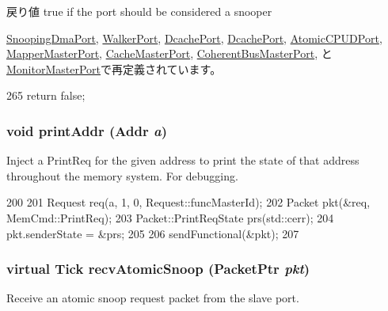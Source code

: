 \begin{DoxyReturn}{戻り値}
true if the port should be considered a snooper 
\end{DoxyReturn}


\hyperlink{classArmISA_1_1TableWalker_1_1SnoopingDmaPort_a32602a6a3c3d66a639455036d6c08dd6}{SnoopingDmaPort}, \hyperlink{classX86ISA_1_1Walker_1_1WalkerPort_a5ce11b7a254d3cb756d94568f7cbc25d}{WalkerPort}, \hyperlink{classFullO3CPU_1_1DcachePort_a32602a6a3c3d66a639455036d6c08dd6}{DcachePort}, \hyperlink{classOzoneLWLSQ_1_1DcachePort_a32602a6a3c3d66a639455036d6c08dd6}{DcachePort}, \hyperlink{classAtomicSimpleCPU_1_1AtomicCPUDPort_a5ce11b7a254d3cb756d94568f7cbc25d}{AtomicCPUDPort}, \hyperlink{classAddrMapper_1_1MapperMasterPort_a5ce11b7a254d3cb756d94568f7cbc25d}{MapperMasterPort}, \hyperlink{classBaseCache_1_1CacheMasterPort_a32602a6a3c3d66a639455036d6c08dd6}{CacheMasterPort}, \hyperlink{classCoherentBus_1_1CoherentBusMasterPort_a32602a6a3c3d66a639455036d6c08dd6}{CoherentBusMasterPort}, と \hyperlink{classCommMonitor_1_1MonitorMasterPort_a5ce11b7a254d3cb756d94568f7cbc25d}{MonitorMasterPort}で再定義されています。


\begin{DoxyCode}
265 { return false; }
\end{DoxyCode}
\hypertarget{classMasterPort_a88aa41e2693dd0091afae2604eba9bed}{
\subsubsection[{printAddr}]{\setlength{\rightskip}{0pt plus 5cm}void printAddr ({\bf Addr} {\em a})}}
\label{classMasterPort_a88aa41e2693dd0091afae2604eba9bed}
Inject a PrintReq for the given address to print the state of that address throughout the memory system. For debugging. 


\begin{DoxyCode}
200 {
201     Request req(a, 1, 0, Request::funcMasterId);
202     Packet pkt(&req, MemCmd::PrintReq);
203     Packet::PrintReqState prs(std::cerr);
204     pkt.senderState = &prs;
205 
206     sendFunctional(&pkt);
207 }
\end{DoxyCode}
\hypertarget{classMasterPort_ae1160d8f94f042aba1dc9a07a72e1e82}{
\subsubsection[{recvAtomicSnoop}]{\setlength{\rightskip}{0pt plus 5cm}virtual {\bf Tick} recvAtomicSnoop ({\bf PacketPtr} {\em pkt})}}
\label{classMasterPort_ae1160d8f94f042aba1dc9a07a72e1e82}
Receive an atomic snoop request packet from the slave port. 

